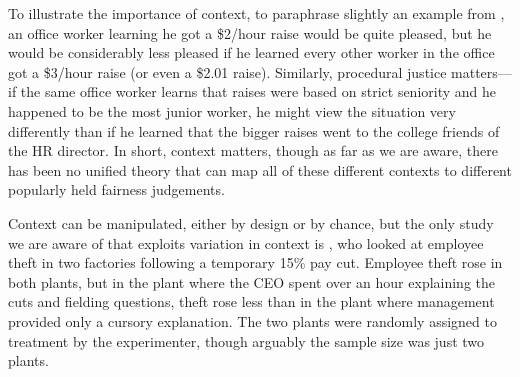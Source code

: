\documentclass[11pt]{article}
\begin{document}
To illustrate the importance of context, to paraphrase slightly an example from \cite{rees1993role}, an office worker learning he got a \$2/hour raise would be quite pleased, but he would be considerably less pleased if he learned every other worker in the office got a \$3/hour raise (or even a \$2.01 raise). 
Similarly, procedural justice matters---if the same office worker learns that raises were based on strict seniority and he happened to be the most junior worker, he might view the situation very differently than if he learned that the bigger raises went to the college friends of the HR director.  
In short, context matters, though as far as we are aware, there has been no unified theory that can map all of these different contexts to different popularly held fairness judgements. 

Context can be manipulated, either by design or by chance, but the only study we are aware of that exploits variation in context is \cite{greenberg1990etr}, who looked at employee theft in two factories following a temporary 15\% pay cut. 
Employee theft rose in both plants, but in the plant where the CEO spent over an hour explaining the cuts and fielding questions, theft rose less than in the plant where management provided only a cursory explanation. 
The two plants were randomly assigned to treatment by the experimenter, though arguably the sample size was just two plants.  
\end{document}

